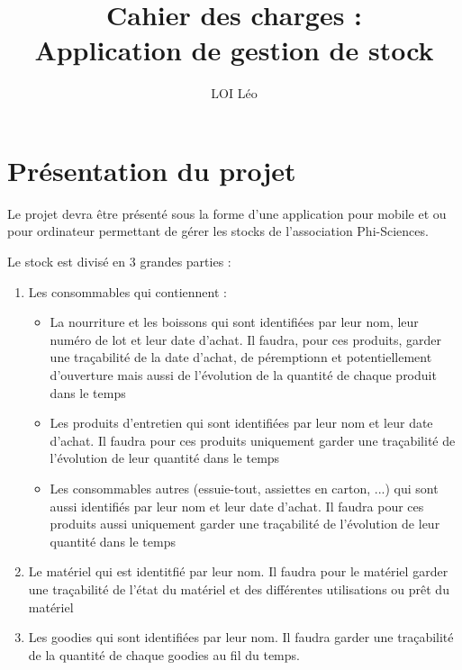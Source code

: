\documentclass{article}
\title{Cahier des charges :\\Application de gestion de stock}
\author{LOI Léo}
\begin{document}
\maketitle
\tableofcontents
\newpage

\section{Présentation du projet}
  Le projet devra être présenté sous la forme d’une application pour mobile et ou pour ordinateur permettant de gérer les stocks de l’association Phi-Sciences.

  Le stock est divisé en 3 grandes parties : 
  \begin{enumerate}
    \item Les consommables qui contiennent : 
    \begin{itemize}
      \item La nourriture et les boissons qui sont identifiées par leur nom, leur numéro de lot et leur date d'achat. Il faudra, pour ces produits, garder une traçabilité de la date d'achat, de péremptionn et potentiellement d'ouverture mais aussi de l'évolution de la quantité de chaque produit dans le temps
      \item Les produits d’entretien qui sont identifiées par leur nom et leur date d'achat. Il faudra pour ces produits uniquement garder une traçabilité de l'évolution de leur quantité dans le temps
      \item Les consommables autres (essuie-tout, assiettes en carton, ...) qui sont aussi identifiés par leur nom et leur date d'achat. Il faudra pour ces produits aussi uniquement garder une traçabilité de l'évolution de leur quantité dans le temps
    \end{itemize}
    \item Le matériel qui est identitfié par leur nom. Il faudra pour le matériel garder une traçabilité de l'état du matériel et des différentes utilisations ou prêt du matériel
    \item Les goodies qui sont identifiées par leur nom. Il faudra garder une traçabilité de la quantité de chaque goodies au fil du temps.
  \end{enumerate}
\end{document}
